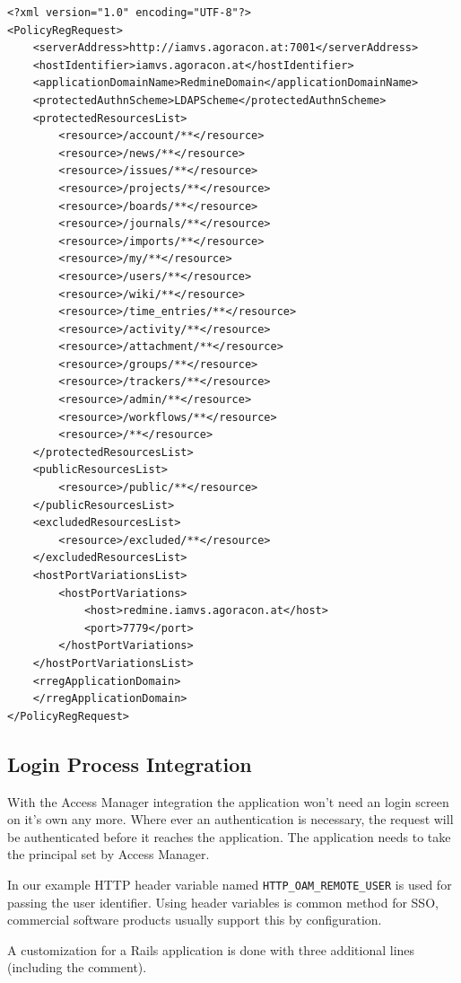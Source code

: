 \documentclass[11pt]{report}
\begin{document}
\begin{Verbatim}[label=Register Application Domain]
<?xml version="1.0" encoding="UTF-8"?>
<PolicyRegRequest>
    <serverAddress>http://iamvs.agoracon.at:7001</serverAddress>
    <hostIdentifier>iamvs.agoracon.at</hostIdentifier>
    <applicationDomainName>RedmineDomain</applicationDomainName>
    <protectedAuthnScheme>LDAPScheme</protectedAuthnScheme>
    <protectedResourcesList>
        <resource>/account/**</resource>
        <resource>/news/**</resource>
        <resource>/issues/**</resource>
        <resource>/projects/**</resource>
        <resource>/boards/**</resource>
        <resource>/journals/**</resource>
        <resource>/imports/**</resource>
        <resource>/my/**</resource>
        <resource>/users/**</resource>
        <resource>/wiki/**</resource>
        <resource>/time_entries/**</resource>
        <resource>/activity/**</resource>
        <resource>/attachment/**</resource>
        <resource>/groups/**</resource>
        <resource>/trackers/**</resource>
        <resource>/admin/**</resource>
        <resource>/workflows/**</resource>
        <resource>/**</resource>
    </protectedResourcesList>
    <publicResourcesList>
        <resource>/public/**</resource>
    </publicResourcesList>
    <excludedResourcesList>
        <resource>/excluded/**</resource>
    </excludedResourcesList>
    <hostPortVariationsList>
        <hostPortVariations>
            <host>redmine.iamvs.agoracon.at</host>
            <port>7779</port>
        </hostPortVariations>
    </hostPortVariationsList>
    <rregApplicationDomain>
    </rregApplicationDomain>
</PolicyRegRequest>
\end{Verbatim}


\subsection{Login Process Integration}

With the Access Manager integration the application won't need an login screen
on it's own any more.  Where ever an authentication is necessary, the request
will be authenticated before it reaches the application.  The application needs
to take the principal set by Access Manager.

In our example HTTP header variable named \verb|HTTP_OAM_REMOTE_USER| is used
for passing the user identifier.  Using header variables is common method for
SSO, commercial software products usually support this by configuration.

A customization for a Rails application is done with three additional lines
(including the comment).
\end{document}
